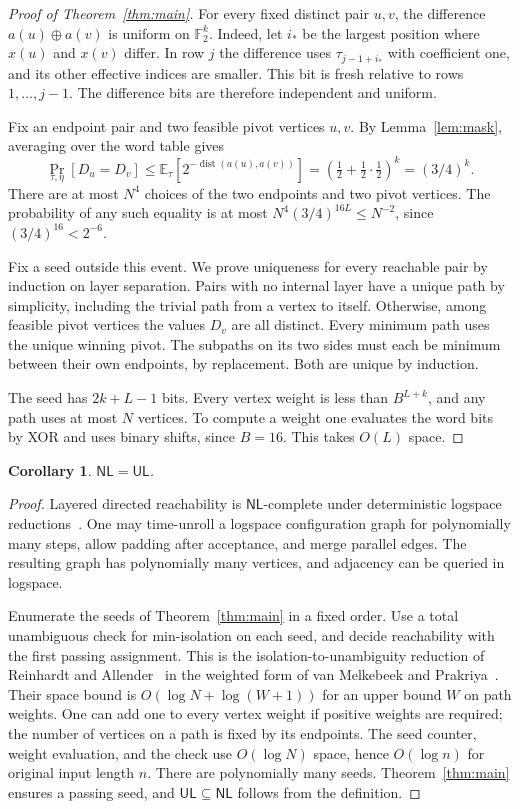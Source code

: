 \documentclass[11pt]{article}
\newtheorem{corollary}[theorem]{Corollary}
\newcommand{\NL}{\mathsf{NL}}
\newcommand{\UL}{\mathsf{UL}}
\newcommand{\F}{\mathbb F}
\newcommand{\dist}{\operatorname{dist}}
\begin{document}
\begin{proof}[Proof of Theorem~\ref{thm:main}]
For every fixed distinct pair $u,v$, the difference
$a(u)\oplus a(v)$ is uniform on $\F_2^k$. Indeed, let $i_*$ be the
largest position where $x(u)$ and $x(v)$ differ. In row $j$ the
difference uses $\tau_{j-1+i_*}$ with coefficient one, and its other
effective indices are smaller. This bit is fresh relative to rows
$1,\ldots,j-1$. The difference bits are therefore independent and uniform.

Fix an endpoint pair and two feasible pivot vertices $u,v$. By
Lemma~\ref{lem:mask}, averaging over the word table gives
\[
   \Pr_{\tau,\eta}[D_u=D_v]\le
    \mathbb E_\tau[2^{-\dist(a(u),a(v))}]
      =\left(\tfrac12+\tfrac12\cdot\tfrac12\right)^k=(3/4)^k.
\]
There are at most $N^4$ choices of the two endpoints and two pivot
vertices. The probability of any such equality is at most
$N^4(3/4)^{16L}\le N^{-2}$, since $(3/4)^{16}<2^{-6}$.

Fix a seed outside this event. We prove uniqueness for every reachable
pair by induction on layer separation. Pairs with no internal layer have
a unique path by simplicity, including the trivial path from a vertex
to itself. Otherwise, among feasible pivot vertices the values $D_v$
are all distinct. Every minimum path uses the unique winning pivot.
The subpaths on its two sides must each be minimum between their own
endpoints, by replacement. Both are unique by induction.

The seed has $2k+L-1$ bits. Every vertex weight is less than
$B^{L+k}$, and any path uses at most $N$ vertices. To compute a weight
one evaluates the word bits by XOR and uses binary shifts, since
$B=16$. This takes $O(L)$ space.
\end{proof}

\begin{corollary}\label{cor:ul}
$\NL=\UL$.
\end{corollary}
\begin{proof}
Layered directed reachability is $\NL$-complete under deterministic
logspace reductions~\cite[Proposition 3.4]{vMP}. One may time-unroll a
logspace configuration graph for polynomially many steps, allow padding
after acceptance, and merge parallel edges. The resulting graph has
polynomially many vertices, and adjacency can be queried in logspace.

Enumerate the seeds of Theorem~\ref{thm:main} in a fixed order.
Use a total unambiguous check for min-isolation on each seed, and
decide reachability with the first passing assignment. This is the
isolation-to-unambiguity reduction of Reinhardt and Allender~\cite{RA}
in the weighted form of van Melkebeek and Prakriya~\cite[Lemma 3.5
and Section 3.2]{vMP}. Their space bound is $O(\log N+\log(W+1))$
for an upper bound $W$ on path weights. One can add one to every
vertex weight if positive weights are required; the number of vertices
on a path is fixed by its endpoints. The seed counter, weight evaluation,
and the check use $O(\log N)$ space, hence $O(\log n)$ for original
input length $n$. There are polynomially many seeds. Theorem~\ref{thm:main}
ensures a passing seed, and $\UL\subseteq\NL$ follows from the definition.
\end{proof}
\end{document}
